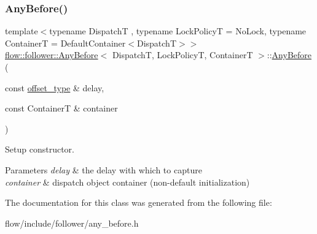 \subsubsection{\texorpdfstring{Any\+Before()}{AnyBefore()}\hspace{0.1cm}{\footnotesize\ttfamily [2/2]}}
{\footnotesize\ttfamily template$<$typename DispatchT , typename Lock\+PolicyT  = No\+Lock, typename ContainerT  = Default\+Container$<$\+Dispatch\+T$>$$>$ \\
\hyperlink{classflow_1_1follower_1_1_any_before}{flow\+::follower\+::\+Any\+Before}$<$ DispatchT, Lock\+PolicyT, ContainerT $>$\+::\hyperlink{classflow_1_1follower_1_1_any_before}{Any\+Before} (\begin{DoxyParamCaption}\item[{const \hyperlink{classflow_1_1follower_1_1_any_before_a6ef017a648741bfd9ca4108556ac8edf}{offset\+\_\+type} \&}]{delay,  }\item[{const ContainerT \&}]{container }\end{DoxyParamCaption})}



Setup constructor. 


\begin{DoxyParams}{Parameters}
{\em delay} & the delay with which to capture \\
\hline
{\em container} & dispatch object container (non-\/default initialization) \\
\hline
\end{DoxyParams}


The documentation for this class was generated from the following file\+:\begin{DoxyCompactItemize}
\item 
flow/include/follower/any\+\_\+before.\+h\end{DoxyCompactItemize}
